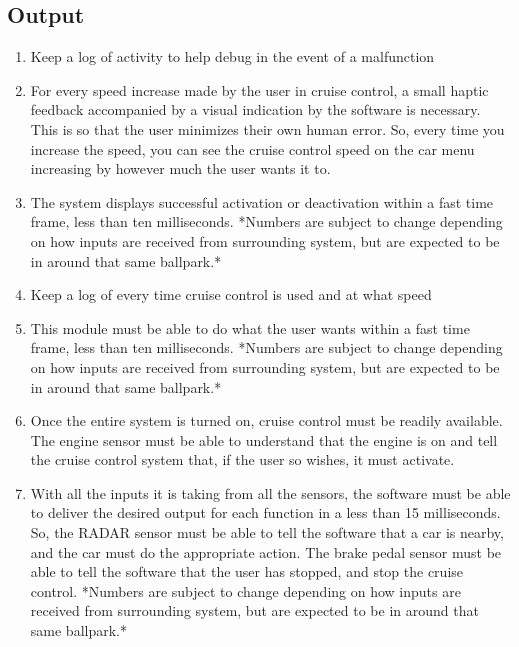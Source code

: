 \documentclass[preprint,11pt,3p]{article}
\begin{document}
\subsection{Output}
\begin{enumerate}
	\item Keep a log of activity to help debug in the event of a malfunction
	\item For every speed increase made by the user in cruise control, a small haptic feedback accompanied by a visual indication by the software is necessary. This is so that the user minimizes their own human error. So, every time you increase the speed, you can see the cruise control speed on the car menu increasing by however much the user wants it to.
	\item The system displays successful activation or deactivation within a fast time frame, less than ten milliseconds. *Numbers are subject to change depending on how inputs are received from surrounding system, but are expected to be in around that same ballpark.*
	\item Keep a log of every time cruise control is used and at what speed
	\item This module must be able to do what the user wants within a fast time frame, less than ten milliseconds. *Numbers are subject to change depending on how inputs are received from surrounding system, but are expected to be in around that same ballpark.*
	\item Once the entire system is turned on, cruise control must be readily available. The engine sensor must be able to understand that the engine is on and tell the cruise control system that, if the user so wishes, it must activate. 
	\item With all the inputs it is taking from all the sensors, the software must be able to deliver the desired output for each function in a less than 15 milliseconds. So, the RADAR sensor must be able to tell the software that a car is nearby, and the car must do the appropriate action. The brake pedal sensor must be able to tell the software that the user has stopped, and stop the cruise control. *Numbers are subject to change depending on how inputs are received from surrounding system, but are expected to be in around that same ballpark.*
\end{enumerate}
\end{document}
